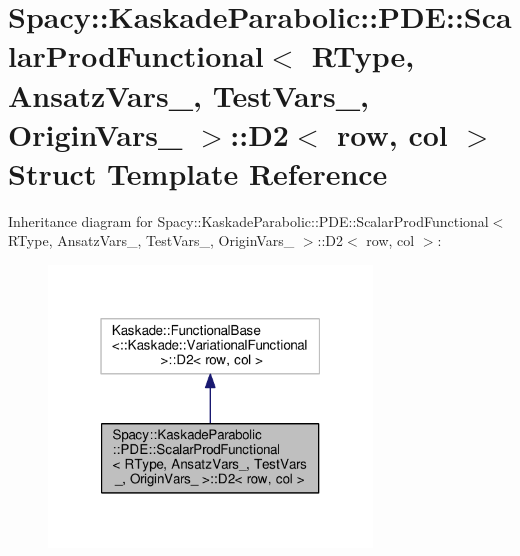 \hypertarget{structSpacy_1_1KaskadeParabolic_1_1PDE_1_1ScalarProdFunctional_1_1D2}{\section{Spacy\-:\-:Kaskade\-Parabolic\-:\-:P\-D\-E\-:\-:Scalar\-Prod\-Functional$<$ R\-Type, Ansatz\-Vars\-\_\-, Test\-Vars\-\_\-, Origin\-Vars\-\_\- $>$\-:\-:D2$<$ row, col $>$ Struct Template Reference}
\label{structSpacy_1_1KaskadeParabolic_1_1PDE_1_1ScalarProdFunctional_1_1D2}
}


Inheritance diagram for Spacy\-:\-:Kaskade\-Parabolic\-:\-:P\-D\-E\-:\-:Scalar\-Prod\-Functional$<$ R\-Type, Ansatz\-Vars\-\_\-, Test\-Vars\-\_\-, Origin\-Vars\-\_\- $>$\-:\-:D2$<$ row, col $>$\-:
\nopagebreak
\begin{figure}[H]
\begin{center}
\leavevmode
\includegraphics[width=244pt]{structSpacy_1_1KaskadeParabolic_1_1PDE_1_1ScalarProdFunctional_1_1D2__inherit__graph}
\end{center}
\end{figure}


